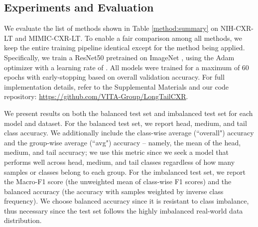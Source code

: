 \documentclass[runningheads]{llncs}
\begin{document}
\subsection{Experiments and Evaluation}
We evaluate the list of methods shown in Table \ref{method:summary} on NIH-CXR-LT and MIMIC-CXR-LT. To enable a fair comparison among all methods, we keep the entire training pipeline identical except for the method being applied. Specifically, we train a ResNet50 \cite{he2016deep} pretrained on ImageNet \cite{deng2009imagenet}, using the Adam optimizer with a learning rate of . All models were trained for a maximum of 60 epochs with early-stopping based on overall validation accuracy. For full implementation details, refer to the Supplemental Materials and our code repository: \url{https://github.com/VITA-Group/LongTailCXR}.


We present results on both the balanced test set and imbalanced test set for each model and dataset. For the balanced test set, we report head, medium, and tail class accuracy. We additionally include the class-wise average (``overall") accuracy and the group-wise average (``avg") accuracy -- namely, the mean of the head, medium, and tail accuracy; we use this metric since we seek a model that performs well across head, medium, and tail classes regardless of how many samples or classes belong to each group. For the imbalanced test set, we report the Macro-F1 score (the unweighted mean of class-wise F1 scores) and the balanced accuracy (the accuracy with samples weighted by inverse class frequency). We choose balanced accuracy since it is resistant to class imbalance, thus necessary since the test set follows the highly imbalanced real-world data distribution.
\end{document}
